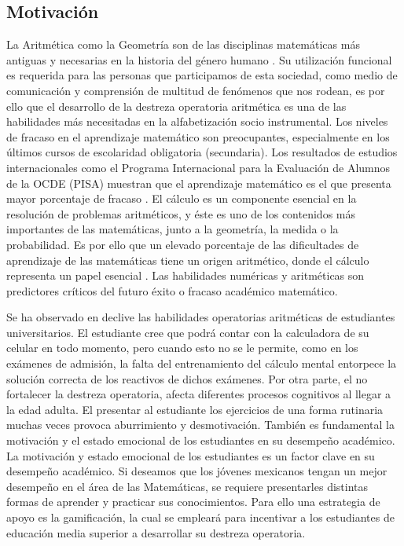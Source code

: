 \documentclass{article}
\begin{document}
\subsection{Motivación}
La Aritmética como la Geometría son de las disciplinas matemáticas más antiguas y necesarias en la historia del género humano \cite{coronado2014estudio}. 
Su utilización funcional es requerida para las personas que participamos de esta sociedad, como medio de comunicación y comprensión de multitud de fenómenos que nos rodean, es por ello que el desarrollo de la destreza operatoria aritmética es una de las habilidades más necesitadas en la alfabetización socio instrumental.
Los niveles de fracaso en el aprendizaje matemático son preocupantes, especialmente en los últimos cursos de escolaridad obligatoria (secundaria). Los resultados de estudios internacionales como el Programa Internacional para la Evaluación de Alumnos de la OCDE (PISA)\cite{oecd2014what,oecd2016low} muestran que el aprendizaje matemático es el que presenta mayor porcentaje de fracaso \cite{coronado2016academic, mullis2016timss}. El cálculo es un componente esencial en la resolución de problemas aritméticos, y éste es uno de los contenidos más importantes de las matemáticas, junto a la geometría, la medida o la probabilidad. 
Es por ello que un elevado porcentaje de las dificultades de aprendizaje de las matemáticas tiene un origen aritmético, donde el cálculo representa un papel esencial \cite{orrantia2006dificultades}. Las habilidades numéricas y aritméticas son predictores críticos del futuro éxito o fracaso académico matemático\cite{rodriguez2017marcadores}. 

Se ha observado en declive las habilidades operatorias aritméticas de estudiantes universitarios\cite{tariq2002decline,carpenter2017psychology,huang2013gamification}. 
El estudiante cree que podrá contar con la calculadora de su celular en todo momento, pero cuando esto no se le permite, como en los exámenes de admisión, la falta del entrenamiento del cálculo mental entorpece la solución correcta de los reactivos 
de dichos exámenes. Por otra parte, el no fortalecer la destreza operatoria, afecta diferentes procesos cognitivos al llegar a la edad adulta\cite{martin2003loss}.
El presentar al estudiante los ejercicios de una forma rutinaria muchas veces provoca aburrimiento y desmotivación. 
También es fundamental la motivación y el estado emocional de los estudiantes en su desempeño académico. La motivación y estado emocional de los estudiantes es un factor clave en su desempeño académico\cite{larrazolo2013habilidades,ryan1997should}. Si deseamos que los jóvenes 
mexicanos tengan un mejor desempeño en el área de las Matemáticas, se requiere presentarles 
distintas formas de aprender y practicar sus conocimientos. Para ello una estrategia de 
apoyo es la gamificación, la cual se empleará para incentivar a los estudiantes de educación 
media superior a desarrollar su destreza operatoria.
\end{document}

